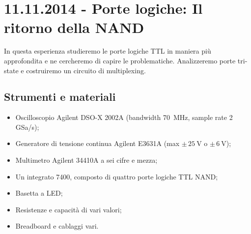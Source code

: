 \section{11.11.2014 - Porte logiche: Il ritorno della NAND}

In questa esperienza studieremo le porte logiche TTL in maniera più approfondita e ne cercheremo di capire le problematiche. Analizzeremo porte tri-state e costruiremo un circuito di multiplexing.

\subsection*{Strumenti e materiali}

\begin{itemize} [noitemsep]
	\item Oscilloscopio Agilent DSO-X 2002A (bandwidth \SI{70}{\mega\hertz}, sample rate \num{2} GSa/s);
	\item Generatore di tensione continua Agilent E3631A (max $\pm \, \SI{25}{\volt}$ o $\pm \, \SI{6}{\volt}$);
	\item Multimetro Agilent 34410A a sei cifre e mezza;
	\item Un integrato 7400, composto di quattro porte logiche TTL NAND; %
	\item Basetta a LED;		
	\item Resistenze e capacità di vari valori;
	\item Breadboard e cablaggi vari.
\end{itemize}
